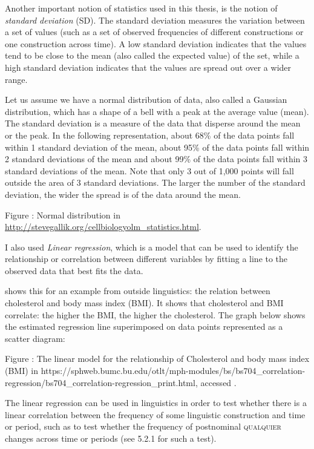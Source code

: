  Another important notion of statistics used in this thesis, is the notion of \textit{standard deviation} (SD). The standard deviation measures the variation between a set of values (such as a set of observed frequencies of different constructions or one construction across time). A low standard deviation indicates that the values tend to be close to the mean (also called the expected value) of the set, while a high standard deviation indicates that the values are spread out over a wider range.

  Let us assume we have a normal distribution of data, also called a Gaussian distribution, which has a shape of a bell with a peak at the average value (mean). The standard deviation is a measure of the data that disperse around the mean or the peak. In the following representation, about 68\% of the data points fall within 1 standard deviation of the mean, about 95\% of the data points fall within 2 standard deviations of the mean and about 99\% of the data points fall within 3 standard deviations of the mean. Note that only 3 out of 1,000 points will fall outside the area of 3 standard deviations. The larger the number of the standard deviation, the wider the spread is of the data around the mean. 

{Figure : Normal distribution in} \url{http://stevegallik.org/cellbiologyolm_statistics.html}{{.}}

I also used \textit{Linear regression}, which is a model that can be used to identify the relationship or correlation between different variables by fitting a line to the observed data that best fits the data. 

   shows this for an example from outside linguistics: the relation between cholesterol and body mass index (BMI). It shows that cholesterol and BMI correlate: the higher the BMI, the higher the cholesterol. The graph below shows the estimated regression line superimposed on data points represented as a scatter diagram:

{Figure : The linear model for the relationship of Cholesterol and body mass index (BMI) in https://sphweb.bumc.bu.edu/otlt/mph-modules/bs/bs704\_correlation-regression/bs704\_correlation-regression\_print.html, accessed \citealt{November2020}.}

The linear regression can be used in linguistics in order to test whether there is a linear correlation between the frequency of some linguistic construction and time or period, such as to test whether the frequency of postnominal \textsc{qualquier} changes across time or periods (see 5.2.1 for such a test).

